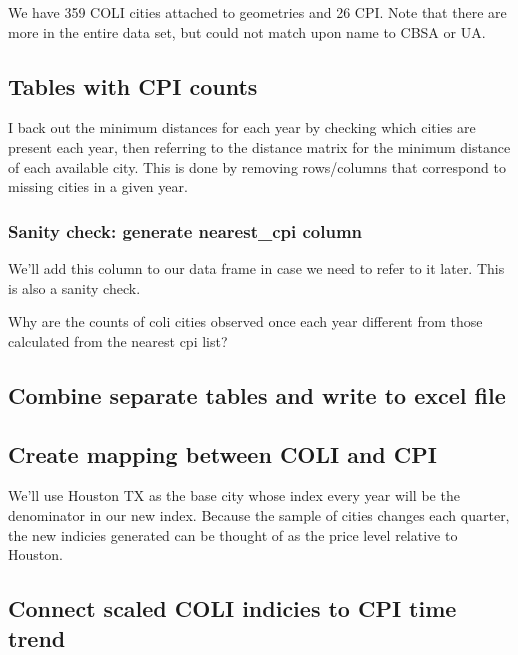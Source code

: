 \documentclass[]{article}
\begin{document}
We have 359 COLI cities attached to geometries and 26 CPI. Note that
there are more in the entire data set, but could not match upon name to
CBSA or UA.

\hypertarget{tables-with-cpi-counts}{%
\subsection{Tables with CPI counts}\label{tables-with-cpi-counts}}

I back out the minimum distances for each year by checking which cities
are present each year, then referring to the distance matrix for the
minimum distance of each available city. This is done by removing
rows/columns that correspond to missing cities in a given year.

\hypertarget{sanity-check-generate-nearest_cpi-column}{%
\subsubsection{Sanity check: generate nearest\_cpi
column}\label{sanity-check-generate-nearest_cpi-column}}

We'll add this column to our data frame in case we need to refer to it
later. This is also a sanity check.

Why are the counts of coli cities observed once each year different from
those calculated from the nearest cpi list?

\hypertarget{combine-separate-tables-and-write-to-excel-file}{%
\subsection{Combine separate tables and write to excel
file}\label{combine-separate-tables-and-write-to-excel-file}}

\hypertarget{create-mapping-between-coli-and-cpi}{%
\subsection{Create mapping between COLI and
CPI}\label{create-mapping-between-coli-and-cpi}}

We'll use Houston TX as the base city whose index every year will be the
denominator in our new index. Because the sample of cities changes each
quarter, the new indicies generated can be thought of as the price level
relative to Houston.

\hypertarget{connect-scaled-coli-indicies-to-cpi-time-trend}{%
\subsection{Connect scaled COLI indicies to CPI time
trend}\label{connect-scaled-coli-indicies-to-cpi-time-trend}}
\end{document}
